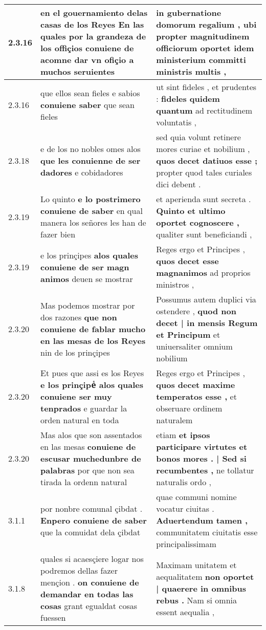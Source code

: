 \begin{tabular}{|p{1cm}|p{6.5cm}|p{6.5cm}|}
2.3.16 & en el gouernamiento delas casas de los Reyes \textbf{ En las quales por la grandeza de los offiçios conuiene de } acomne dar vn ofiçio a muchos seruientes & in gubernatione domorum regalium , \textbf{ ubi propter magnitudinem officiorum oportet } idem ministerium committi ministris multis , \\\hline
2.3.16 & que ellos sean fieles e sabios \textbf{ conuiene saber } que sean fieles & ut sint fideles , et prudentes : \textbf{ fideles quidem quantum } ad rectitudinem voluntatis , \\\hline
2.3.18 & e de los no nobles omes alos \textbf{ que les conuienne de ser dadores } e cobidadores & sed quia volunt retinere mores curiae et nobilium , \textbf{ quos decet datiuos esse ; } propter quod tales curiales dici debent . \\\hline
2.3.19 & Lo quinto \textbf{ e lo postrimero conuiene de saber } en qual manera los señores les han de fazer bien & et aperienda sunt secreta . \textbf{ Quinto et ultimo oportet cognoscere , } qualiter sunt beneficiandi , \\\hline
2.3.19 & e los prinçipes \textbf{ alos quales conuiene de ser magn animos } deuen se mostrar & Reges ergo et Principes , \textbf{ quos decet esse magnanimos } ad proprios ministros , \\\hline
2.3.20 & Mas podemos mostrar por dos razones \textbf{ que non conuiene de fablar mucho en las mesas de los Reyes } nin de los prinçipes & Possumus autem duplici via ostendere , \textbf{ quod non decet | in mensis Regum et Principum } et uniuersaliter omnium nobilium \\\hline
2.3.20 & Et pues que assi es los Reyes \textbf{ e los prinçipeᷤ alos quales conuiene ser muy tenprados } e guardar la orden natural en toda & Reges ergo et Principes , \textbf{ quos decet maxime temperatos esse , } et obseruare ordinem naturalem \\\hline
2.3.20 & Mas alos que son assentados en las mesas \textbf{ conuiene de escusar muchedunbre de palabras } por que non sea tirada la ordenn natural & etiam \textbf{ et ipsos participare virtutes et bonos mores . | Sed si recumbentes , } ne tollatur naturalis ordo , \\\hline
3.1.1 & por nonbre comunal çibdat . \textbf{ Enpero conuiene de saber } que la comuidat dela çibdat & quae communi nomine vocatur ciuitas . \textbf{ Aduertendum tamen , } communitatem ciuitatis esse principalissimam \\\hline
3.1.8 & quales si acaesçiere logar nos podremos dellas fazer mençion . \textbf{ on conuiene de demandar en todas las cosas } grant egualdat cosas fuessen & Maximam unitatem et aequalitatem \textbf{ non oportet | quaerere in omnibus rebus . } Nam si omnia essent aequalia , \\\hline

\end{tabular}
